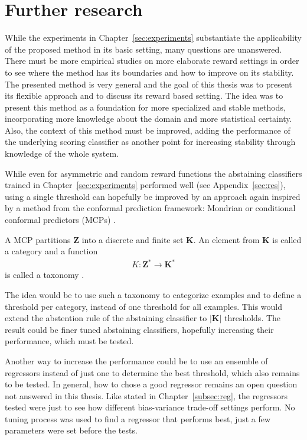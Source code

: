 \documentclass[twoside,11pt]{article}
\def\Z{\textbf{Z}}
\begin{document}

\section{Further research}
\label{sec:further_research}

While the experiments in Chapter~\ref{sec:experiments}
substantiate the applicability of the proposed method in
its basic setting, many questions are unanswered.
There must be more empirical studies on more elaborate
reward settings in order to see where the method has its
boundaries and how to improve on its stability.
The presented method is very general and the goal of this
thesis was to present its flexible approach and to discuss
its reward based setting.
The idea was to present this method as a foundation for
more specialized and stable methods, incorporating more
knowledge about the domain and more statistical certainty.
Also, the context of this method must be improved,
adding the performance of the underlying scoring classifier
as another point for increasing stability through knowledge
of the whole system.

While even for asymmetric and random reward functions the
abstaining classifiers trained in
Chapter~\ref{sec:experiments} performed well
(see Appendix~\ref{sec:res}), using a single threshold
can hopefully be improved by an approach again inspired by
a method from the conformal prediction framework:
Mondrian or conditional conformal predictors (MCPs)
\citep[see][]{alrw, cprml, fassbender_2019}.

\def\K{\textbf{K}}

A MCP partitions $\Z$ into a discrete and finite set
$\K$. An element from $\K$ is called a category and
a function
\begin{align*}
  K: \Z^* \rightarrow \K^*
\end{align*}
is called a taxonomy \citep[see][Chapter 2]{cprml}.

The idea would be to use such a taxonomy to categorize
examples and to define a threshold per category, instead of
one threshold for all examples.
This would extend the abstention rule of the abstaining
classifier to $|\K|$ thresholds.
The result could be finer tuned abstaining classifiers,
hopefully increasing their performance, which must be
tested.

Another way to increase the performance could be to use
an ensemble of regressors instead of just one to determine
the best threshold, which also remains to be tested.
In general, how to chose a good regressor remains an open
question not answered in this thesis.
Like stated in Chapter~\ref{subsec:reg}, the regressors
tested were just to see how different bias-variance
trade-off settings perform.
No tuning process was used to find a regressor that
performs best, just a few parameters were set before the
tests.
\end{document}
